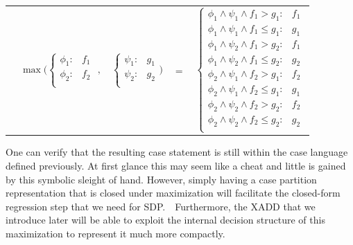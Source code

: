 \documentclass[letterpaper]{article}
\begin{document}
{\footnotesize
\begin{center}
\begin{tabular}{r c c c l}
&
\hspace{-9mm} $\max \Bigg(
  \begin{cases}
    \phi_1: & f_1 \\ 
    \phi_2: & f_2 \\ 
  \end{cases}$
$,$
&
\hspace{-4mm}
  $\begin{cases}
    \psi_1: & g_1 \\ 
    \psi_2: & g_2 \\ 
  \end{cases} \Bigg)$
&
\hspace{-4mm} 
$ = $
&
\hspace{-4mm}
  $\begin{cases}
  \phi_1 \wedge \psi_1 \wedge f_1 > g_1    : & f_1 \\ 
  \phi_1 \wedge \psi_1 \wedge f_1 \leq g_1 : & g_1 \\ 
  \phi_1 \wedge \psi_2 \wedge f_1 > g_2    : & f_1 \\ 
  \phi_1 \wedge \psi_2 \wedge f_1 \leq g_2 : & g_2 \\ 
  \phi_2 \wedge \psi_1 \wedge f_2 > g_1    : & f_2 \\ 
  \phi_2 \wedge \psi_1 \wedge f_2 \leq g_1 : & g_1 \\ 
  \phi_2 \wedge \psi_2 \wedge f_2 > g_2    : & f_2 \\ 
  \phi_2 \wedge \psi_2 \wedge f_2 \leq g_2 : & g_2 \\ 
  \end{cases}$
\end{tabular}
\end{center}
}
One can verify that the resulting case statement is still
within the case language defined previously.  At first
glance this may seem like a cheat and little is gained
by this symbolic sleight of hand.  However, simply
having a case partition representation that is closed under 
maximization will facilitate the closed-form regression 
step that we need for SDP.\ \  Furthermore, the 
XADD that we introduce later will be able to exploit the 
internal decision structure of this
maximization to represent it much more compactly.
\end{document}

